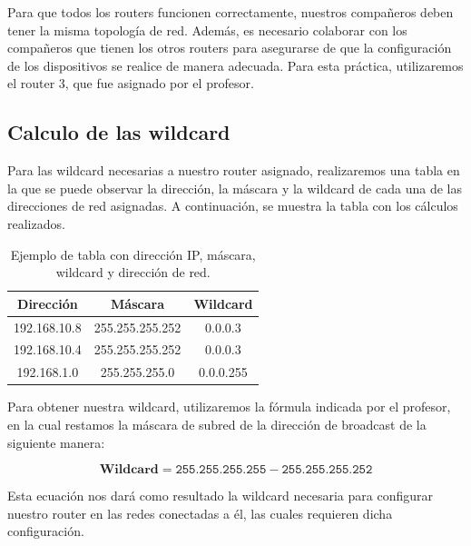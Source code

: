     Para que todos los routers funcionen correctamente, nuestros compañeros deben tener la misma topología de red. Además, es necesario colaborar con los compañeros que tienen los otros routers para asegurarse de que la configuración de los dispositivos se realice de manera adecuada. Para esta práctica, utilizaremos el router 3, que fue asignado por el profesor.
    
    \subsection{Calculo de las wildcard}
    Para las wildcard necesarias a nuestro router asignado, realizaremos una tabla en la que se puede observar la dirección, la máscara y la wildcard de cada una de las direcciones de red asignadas. A continuación, se muestra la tabla con los cálculos realizados.
        \begin{table}[H]
            \centering
            \begin{tabular}{c|c|c}
                \textbf{Dirección} & \textbf{Máscara} & \textbf{Wildcard} \\
                \hline
                192.168.10.8 & 255.255.255.252 & 0.0.0.3 \\
                192.168.10.4 & 255.255.255.252 & 0.0.0.3  \\
                192.168.1.0 & 255.255.255.0 & 0.0.0.255 \\
            \end{tabular}
            \caption{Ejemplo de tabla con dirección IP, máscara, wildcard y dirección de red.}
        \end{table}
        Para obtener nuestra wildcard, utilizaremos la fórmula indicada por el profesor, en la cual restamos la máscara de subred de la dirección de broadcast de la siguiente manera:

        \begin{equation}
            \textbf{Wildcard} = \texttt{255.255.255.255} - \texttt{255.255.255.252}
           \end{equation}
        
        Esta ecuación nos dará como resultado la wildcard necesaria para configurar nuestro router en las redes conectadas a él, las cuales requieren dicha configuración.
